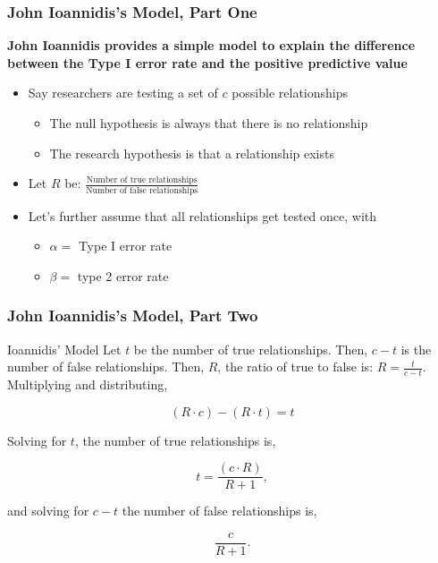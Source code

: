 \documentclass[10pt, block=fill]{beamer}
\begin{document}
\begin{frame}
    \frametitle{John Ioannidis's Model, Part One}
    
    \textbf{John Ioannidis provides a simple model to explain the difference between the Type I error rate and the positive predictive value}
    \begin{itemize}
        \item Say researchers are testing a set of $c$ possible relationships
        \begin{itemize}
            \item The null hypothesis is always that there is no relationship
            \item The research hypothesis is that a relationship exists
        \end{itemize}
        \vspace{0.25in}
        \item Let $R$ be: $\frac{ \text{Number of true relationships} }{ \text{Number of false relationships} }$
        \vspace{0.25in}
        \item Let's further assume that all relationships get tested once, with
        \begin{itemize}
            \item $\alpha=$ Type I error rate
            \item $\beta=$ type 2 error rate 
        \end{itemize} 
    \end{itemize}
\end{frame}


\begin{frame}
    \frametitle{John Ioannidis's Model, Part Two}
    
    \begin{block}{Ioannidis' Model} 
    Let $t$ be the number of true relationships. Then, $c-t$ is the number of false relationships. Then, $R$, the ratio of true to false is: $R=\frac{t}{c-t}$. Multiplying and distributing,
    
    $$ 
        (R\cdot c) - (R\cdot t) = t
    $$ 
    
    Solving for $t$, the number of true relationships is, 
    
    $$
        t = \frac{(c\cdot R)}{R+1}, 
    $$
    
    and solving for $c-t$ the number of false relationships is, 
    
    $$
        \frac{c}{R+1}.
    $$
    \end{block}

\end{frame} 
\end{document}
